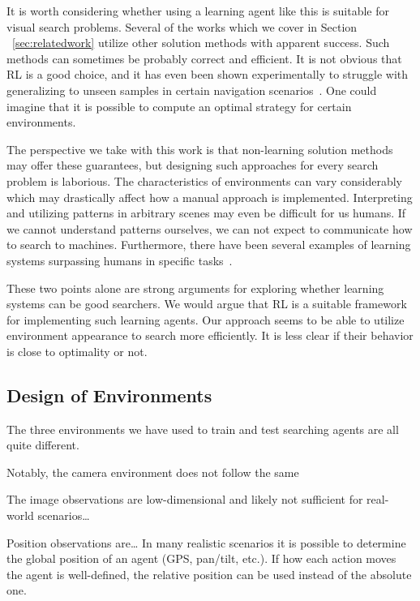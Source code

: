 It is worth considering whether using a learning agent like this is suitable for visual search problems.
Several of the works which we cover in Section ~\ref{sec:relatedwork} utilize other solution methods with apparent success.
Such methods can sometimes be probably correct and efficient.
It is not obvious that RL is a good choice, and it has even been shown experimentally to struggle with generalizing to unseen samples in certain navigation scenarios~\cite{dhiman_critical_2019}.
One could imagine that it is possible to compute an optimal strategy for certain environments.

The perspective we take with this work is that non-learning solution methods may offer these guarantees, but designing such approaches for every search problem is laborious.
The characteristics of environments can vary considerably which may drastically affect how a manual approach is implemented.
Interpreting and utilizing patterns in arbitrary scenes may even be difficult for us humans.
If we cannot understand patterns ourselves, we can not expect to communicate how to search to machines.
Furthermore, there have been several examples of learning systems surpassing humans in specific tasks~\cite{silver_alphago_2016,vinyals_alphastar_2019}.

These two points alone are strong arguments for exploring whether learning systems can be good searchers.
We would argue that RL is a suitable framework for implementing such learning agents.
Our approach seems to be able to utilize environment appearance to search more efficiently.
It is less clear if their behavior is close to optimality or not.

\subsection{Design of Environments}

The three environments we have used to train and test searching agents are all quite different.

Notably, the camera environment does not follow the same 

The image observations are low-dimensional and likely not sufficient for real-world scenarios\dots

Position observations are\dots
In many realistic scenarios it is possible to determine the global position of an agent (GPS, pan/tilt, etc.).
If how each action moves the agent is well-defined, the relative position can be used instead of the absolute one.

